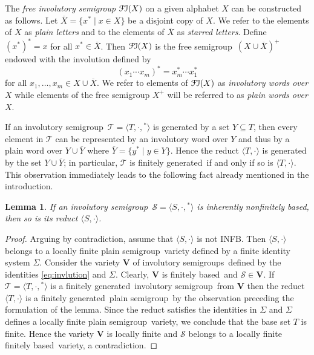 \documentclass[11pt,reqno]{amsart}
\newcommand{\sgp}{semi\-group}
\newcommand{\is}{involutory semi\-group}
\newcommand{\iss}{involutory semi\-groups}
\newcommand{\fb}{finitely based}
\newcommand{\fg}{finitely generated}
\newcommand{\infb}{inherently non\-finitely based}
\newcommand{\FI}{\ensuremath{\mathcal{F\kern-.3pt I}}}
\newtheorem{Lemma}[Thm]{Lemma}
\begin{document}
The \emph{free \is} $\FI(X)$ on a given alphabet $X$ can be constructed as follows.  Let $\overline{X}=\{x^*\mid x\in X\}$ be a disjoint
copy of $X$. We refer to the elements of $X$ as \emph{plain letters} and to the elements of $\overline{X}$ as \emph{starred letters}.
Define $(x^*)^*=x$ for all $x^*\in \overline{X}$. Then $\FI(X)$ is the free \sgp\ $(X\cup\overline{X})^+$ endowed with the involution
defined by
$$(x_1\cdots x_m)^* = x_m^*\cdots x_1^*$$
for all $x_1,\dots,x_m\in X\cup \overline{X}$. We refer to elements of $\FI(X)$ as \emph{involutory words over $X$} while elements of the
free semigroup $X^+$ will be referred to as \emph{plain words over $X$}.

If an \is\ $\mathcal{T}=\langle T,\cdot,{}^*\rangle$ is generated by a set $Y\subseteq T$, then every element in $\mathcal{T}$ can be
represented by an involutory word over $Y$ and thus by a plain word over $Y\cup\overline{Y}$ where $\overline{Y}=\{y^*\mid y\in Y\}$. Hence
the reduct $\langle T,\cdot\rangle$ is generated by the set $Y\cup\overline{Y}$; in particular, $\mathcal{T}$ is \fg\ if and only if so is
$\langle T,\cdot\rangle$. This observation immediately leads to the following fact already mentioned in the introduction.

\begin{Lemma}
\label{easy} If an \is\ $\mathcal{S}=\langle S,\cdot,{}^*\rangle$ is \infb, then so is its reduct $\langle S,\cdot\rangle$.
\end{Lemma}

\begin{proof}
Arguing by contradiction, assume that $\langle S,\cdot\rangle$ is not INFB. Then $\langle S,\cdot\rangle$ belongs to a locally finite plain
\sgp\ variety defined by a finite identity system $\Sigma$. Consider the variety $\mathbf{V}$ of \iss\ defined by the identities
\eqref{eq:invlution} and $\Sigma$. Clearly, $\mathbf{V}$ is \fb\ and $\mathcal{S}\in\mathbf{V}$. If $\mathcal{T}=\langle
T,\cdot,{}^*\rangle$ is a \fg\ \is\ from $\mathbf{V}$ then the reduct $\langle T,\cdot\rangle$ is a \fg\ plain \sgp\ by the observation
preceding the formulation of the lemma. Since the reduct satisfies the identities in $\Sigma$ and $\Sigma$ defines a locally finite plain
\sgp\ variety, we conclude that the base set $T$ is finite. Hence the variety $\mathbf{V}$ is locally finite and $\mathcal{S}$ belongs to a
locally finite \fb\ variety, a contradiction.
\end{proof}
\end{document}
